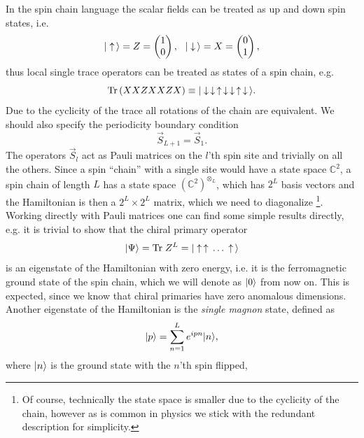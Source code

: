 In the spin chain language the scalar fields can be treated as up and down spin states, i.e.
\begin{equation}
	|\uparrow\,\rangle = Z = \left( \begin{matrix} 1 \\ 0 \end{matrix} \right), \,\,\,\, |\downarrow\,\rangle = X = \left( \begin{matrix} 0 \\ 1 \end{matrix} \right),
\end{equation}
thus local single trace operators can be treated as states of a spin chain, e.g.
\begin{equation}
	\mathrm{Tr} \left( XXZXXZX \right) \equiv |\downarrow \, \downarrow \, \uparrow \, \downarrow \, \downarrow \, \uparrow \, \downarrow \,\rangle.
\end{equation}
Due to the cyclicity of the trace all rotations of the chain are equivalent. 
We should also specify the periodicity boundary condition
\begin{equation}
	\vec{S}_{L+1} = \vec{S}_1.
\end{equation}
The operators $\vec{S}_l$ act as Pauli matrices on the $l$'th spin site and trivially on all the others. 
Since a spin ``chain'' with a single site would have a state space $\mathbb{C}^2$, a spin chain of length $L$ has a state space $(\mathbb{C}^2)^{\otimes_L}$, which has $2^L$ basis vectors and the Hamiltonian is then a $2^L \times 2^L$ matrix, which we need to diagonalize \footnote{Of course, technically the state space is smaller due to the cyclicity of the chain, however as is common in physics we stick with the redundant description for simplicity.}.
Working directly with Pauli matrices one can find some simple results directly, e.g. it is trivial to show that the chiral primary operator
\begin{equation}
	|\Psi\rangle = \mathrm{Tr} \; Z^L = |\uparrow \, \uparrow \, \dots \, \uparrow \,\rangle
\end{equation}
is an eigenstate of the Hamiltonian with zero energy, i.e. it is the ferromagnetic ground state of the spin chain, which we will denote as $|0\rangle$ from now on. 
This is expected, since we know that chiral primaries have zero anomalous dimensions. 
Another eigenstate of the Hamiltonian is the \emph{single magnon} state, defined as
\begin{equation}
	|p\rangle = \sum_{n=1}^L e^{ipn} |n\rangle,
\end{equation} 
where $|n\rangle$ is the ground state with the $n$'th spin flipped,
